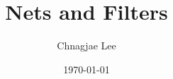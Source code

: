 \documentclass[a4paper,12pt]{book}
\title{Nets and Filters}
\author{Chnagjae Lee}
\date{\today}
\theoremstyle{definition}
\theoremstyle{plain}
\theoremstyle{remark}
\begin{document}
\frontmatterW
\maketitle
\tableofcontents
\end{document}
